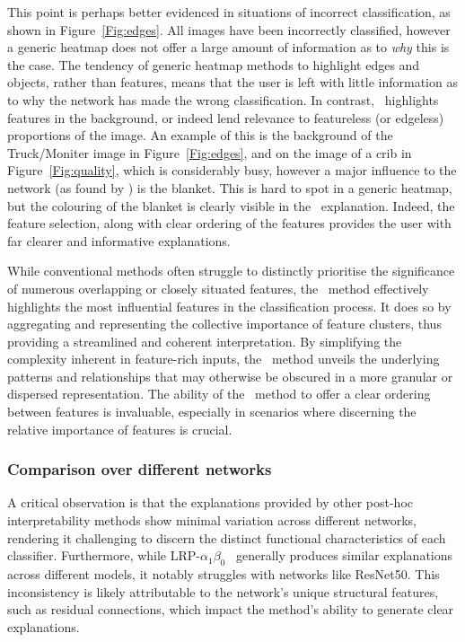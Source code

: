 This point is perhaps better evidenced in situations of incorrect classification, as shown in Figure~\ref{Fig:edges}. All images have been incorrectly classified, however a generic heatmap does not offer a large amount of information as to \textit{why} this is the case. The tendency of generic heatmap methods to highlight edges and objects, rather than features, means that the user is left with little information as to why the network has made the wrong classification. In contrast, \CTC\ highlights features in the background, or indeed lend relevance to featureless (or edgeless) proportions of the image. An example of this is the background of the Truck/Moniter image in Figure~\ref{Fig:edges}, and on the image of a crib in Figure~\ref{Fig:quality}, which is considerably busy, however a major influence to the network (as found by \CTC) is the blanket. This is hard to spot in a generic heatmap, but the colouring of the blanket is clearly visible in the \CTC\ explanation. Indeed, the feature selection, along with clear ordering of the features provides the user with far clearer and informative explanations.

While conventional methods often struggle to distinctly prioritise the significance of numerous overlapping or closely situated features, the \CTC\ method effectively highlights the most influential features in the classification process. It does so by aggregating and representing the collective importance of feature clusters, thus providing a streamlined and coherent interpretation. By simplifying the complexity inherent in feature-rich inputs, the \CTC\ method unveils the underlying patterns and relationships that may otherwise be obscured in a more granular or dispersed representation. The ability of the \CTC\ method to offer a clear ordering between features is invaluable, especially in scenarios where discerning the relative importance of features is crucial.



\subsubsection{Comparison over different networks}

A critical observation is that the explanations provided by other post-hoc interpretability methods show minimal variation across different networks, rendering it challenging to discern the distinct functional characteristics of each classifier. Furthermore, while LRP-$\alpha_1\beta_0$~\cite{bach2015pixel} generally produces similar explanations across different models, it notably struggles with networks like ResNet50. This inconsistency is likely attributable to the network’s unique structural features, such as residual connections, which impact the method's ability to generate clear explanations.

